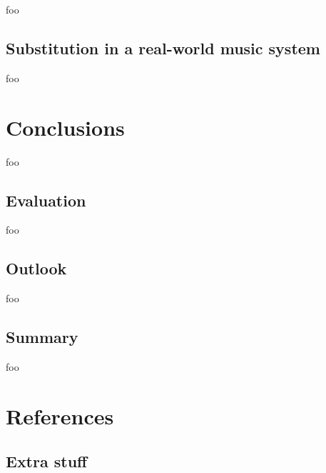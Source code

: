 \documentclass[letter,12pt,notitlepage]{article}
\begin{document}
foo

\subsection{Substitution in a real-world music system}

foo

\section{Conclusions}

foo

\subsection{Evaluation}

foo

\subsection{Outlook}

foo

\subsection{Summary}

foo

\vfill
\clearpage %

\section{References}
\printbibliography[heading=none]

\vfill
\clearpage %

\begin{appendices}

\section{Extra stuff}
\label{appendix:rthpss}

\end{appendices}
\end{document}
